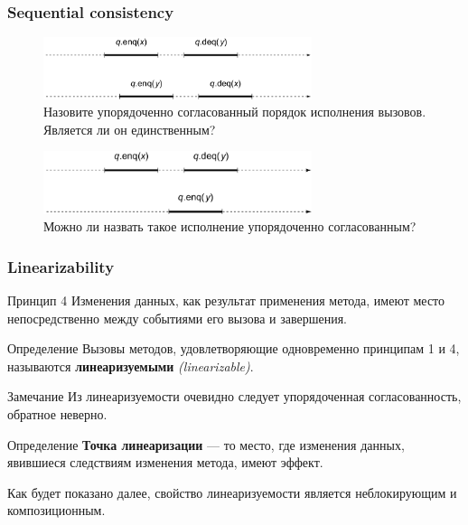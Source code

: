 \documentclass[aspectratio=169, pdf, 8pt, unicode]{beamer}
\newcounter{defCnt}
\begin{document}
\begin{frame}[fragile]
\frametitle{Sequential consistency}
\begin{figure}[H]
\centering
\includegraphics[width=0.7\textwidth]{fig/sequential_consistency_1.png}
\\
\bigskip
Назовите упорядоченно согласованный порядок исполнения вызовов. Является ли он единственным?
\end{figure}
\begin{figure}[H]
\centering
\includegraphics[width=0.7\textwidth]{fig/sequential_consistency_2.png}
\\
\bigskip
Можно ли назвать такое исполнение упорядоченно согласованным?
\end{figure}
\end{frame}

\begin{frame}[fragile]
\frametitle{Linearizability}
\begin{exampleblock}{Принцип 4}
    Изменения данных, как результат применения метода, имеют место непосредственно между событиями его вызова и завершения.
\end{exampleblock}
\begin{block}{Определение }
    Вызовы методов, удовлетворяющие одновременно принципам 1 и 4, называются \textbf{линеаризуемыми}
    \textit{(linearizable)}.
\end{block}
\begin{block}{Замечание}
    Из линеаризуемости очевидно следует упорядоченная согласованность, обратное неверно.
\end{block}
\begin{block}{Определение }
    \textbf{Точка линеаризации} --- то место, где изменения данных, явившиеся следствиям изменения метода, имеют эффект.
\end{block}

Как будет показано далее, свойство линеаризуемости является неблокирующим и композиционным.
\end{frame}
\end{document}
